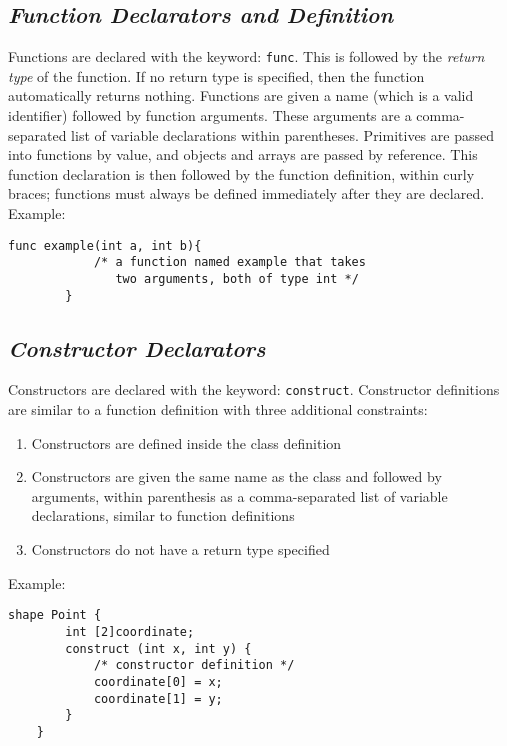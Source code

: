     \subsection{\textit{Function Declarators and Definition}}
    Functions are declared with the keyword: \texttt{func}. This is followed by the \textit{return type} of the function. If no return type is specified, then the function automatically returns nothing. Functions are given a name (which is a valid identifier) followed by function arguments. These arguments are a comma-separated list of variable declarations within parentheses. Primitives are passed into functions by value, and objects and arrays are passed by reference. This function declaration is then followed by the function definition, within curly braces; functions must always be defined immediately after they are declared.\\
    Example:\\
    \begin{lstlisting}[style=sol]
        func example(int a, int b){
            /* a function named example that takes
               two arguments, both of type int */
        }
    \end{lstlisting}

    \subsection{\textit{Constructor Declarators}}
    Constructors are declared with the keyword: \texttt{construct}. Constructor definitions are similar to a function definition with three additional constraints: 
    \begin{enumerate}
        \itemsep0em
        \item Constructors are defined inside the class definition
        \item Constructors are given the same name as the class and followed by arguments, within parenthesis as a comma-separated list of variable declarations, similar to function definitions
        \item Constructors do not have a return type specified
    \end{enumerate}
    Example:\\
    \begin{lstlisting}[style=sol]
    shape Point {
        int [2]coordinate;
        construct (int x, int y) {
            /* constructor definition */
            coordinate[0] = x;
            coordinate[1] = y;
        }
    }
    \end{lstlisting}


